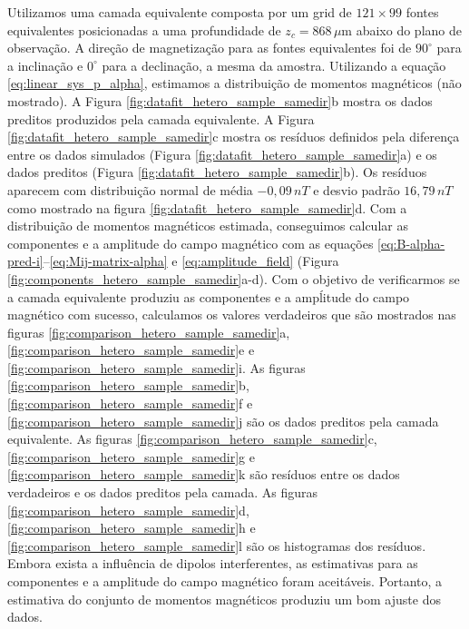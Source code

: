 Utilizamos uma camada equivalente composta por um grid de $121 \times 99$ fontes equivalentes posicionadas a uma profundidade de $z_c = 868\, \mu $m abaixo do plano de observação. A direção de magnetização para as fontes equivalentes foi de $90^\circ$ para a inclinação e $0^\circ$ para a declinação, a mesma da amostra. 
Utilizando a equação \ref{eq:linear_sys_p_alpha}, estimamos a distribuição de momentos magnéticos (não mostrado). A Figura \ref{fig:datafit_hetero_sample_samedir}b mostra os dados preditos produzidos pela camada equivalente. A Figura \ref{fig:datafit_hetero_sample_samedir}c mostra os resíduos definidos pela diferença entre os dados simulados (Figura \ref{fig:datafit_hetero_sample_samedir}a) e os dados preditos (Figura \ref{fig:datafit_hetero_sample_samedir}b). Os resíduos aparecem com distribuição normal de média $-0,09 \, nT$ e desvio padrão $16,79 \, nT$ como mostrado na figura \ref{fig:datafit_hetero_sample_samedir}d. Com a distribuição de momentos magnéticos estimada, conseguimos calcular as componentes e a amplitude do campo magnético com as equações \ref{eq:B-alpha-pred-i}--\ref{eq:Mij-matrix-alpha} e \ref{eq:amplitude_field} (Figura \ref{fig:components_hetero_sample_samedir}a-d). Com o objetivo de verificarmos se a camada equivalente produziu as componentes e a ampĺitude do campo magnético com sucesso, calculamos os valores verdadeiros que são mostrados nas  figuras \ref{fig:comparison_hetero_sample_samedir}a, \ref{fig:comparison_hetero_sample_samedir}e e \ref{fig:comparison_hetero_sample_samedir}i. As figuras \ref{fig:comparison_hetero_sample_samedir}b, \ref{fig:comparison_hetero_sample_samedir}f e \ref{fig:comparison_hetero_sample_samedir}j são os dados preditos pela camada equivalente. As figuras \ref{fig:comparison_hetero_sample_samedir}c, \ref{fig:comparison_hetero_sample_samedir}g e \ref{fig:comparison_hetero_sample_samedir}k são resíduos entre os dados verdadeiros e os dados preditos pela camada. As figuras \ref{fig:comparison_hetero_sample_samedir}d, \ref{fig:comparison_hetero_sample_samedir}h e \ref{fig:comparison_hetero_sample_samedir}l são os histogramas dos resíduos. Embora exista a influência de dipolos interferentes, as estimativas para as componentes e a amplitude do campo magnético foram aceitáveis. Portanto, a estimativa do conjunto de momentos magnéticos produziu um bom ajuste dos dados.   


